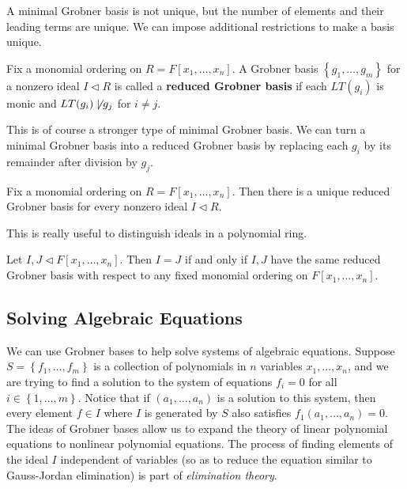 \documentclass{memoir}
\begin{document}
A minimal Grobner basis is not unique, but the number of elements and their leading terms are unique. We can impose additional restrictions to make a basis unique.

\begin{defn}
	Fix a monomial ordering on \(R = F[x_1,\ldots,x_n]\). A Grobner basis \(\left\{ g_1,\ldots,g_m \right\} \) for a nonzero ideal \(I\triangleleft R\) is called a \textbf{reduced Grobner basis} if each \(LT(g_i)\) is monic and \(LT(g_i)\not\mid g_j\) for \(i\neq j\).
\end{defn}
This is of course a stronger type of minimal Grobner basis. We can turn a minimal Grobner basis into a reduced Grobner basis by replacing each \(g_i\) by its remainder after division by \(g_j\).

\begin{thm}
	Fix a monomial ordering on \(R = F[x_1,\ldots,x_n]\). Then there is a unique reduced Grobner basis for every nonzero ideal \(I \triangleleft R\).
\end{thm}
This is really useful to distinguish ideals in a polynomial ring.

\begin{cor}
	Let \(I,J \triangleleft F[x_1,\ldots,x_n]\). Then \(I=J\) if and only if \(I,J\) have the same reduced Grobner basis with respect to any fixed monomial ordering on \(F[x_1,\ldots,x_n]\).
\end{cor}

\begin{exmp}
	
\end{exmp}

\subsection{Solving Algebraic Equations}
\label{sub:solving_algebraic_equations}

We can use Grobner bases to help solve systems of algebraic equations. Suppose \(S = \left\{ f_1,\ldots,f_m \right\} \) is a collection of polynomials in \(n\) variables \(x_1,\ldots,x_n\), and we are trying to find a solution to the system of equations \(f_i = 0\) for all \(i \in \left\{ 1,\ldots,m \right\} \). Notice that if \((a_1,\ldots,a_n)\) is a solution to this system, then every element \(f \in I\) where \(I\) is generated by \(S\) also satisfies \(f_1(a_1,\ldots,a_n) = 0\).\\

The ideas of Grobner bases allow us to expand the theory of linear polynomial equations to nonlinear polynomial equations. The process of finding elements of the ideal \(I\) independent of variables (so as to reduce the equation similar to Gauss-Jordan elimination) is part of \textit{elimination theory}.
\end{document}
